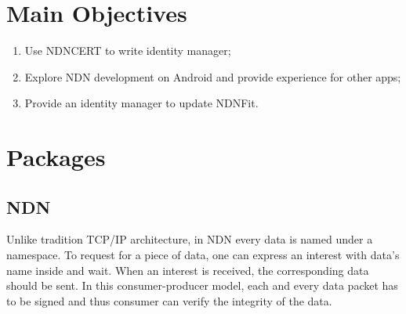 \documentclass[a0,portrait]{poster}
\begin{document}
\begin{multicols}{2}
\section*{Main Objectives}

\begin{enumerate}
\item Use NDNCERT to write identity manager;
\item Explore NDN development on Android and provide experience for other apps;
\item Provide an identity manager to update NDNFit.
\end{enumerate}


\section*{Packages}


\subsection*{NDN\cite{zhang2014named}}
\par
	Unlike tradition TCP/IP architecture, in NDN every data is named under a namespace. 
	To request for a piece of data, one can express an interest with data's name inside and wait.
	When an interest is received, the corresponding data should be sent. 
	In this consumer-producer model, each and every data packet has to be signed and thus consumer can verify the integrity of the data.


\end{multicols}
\end{document}
